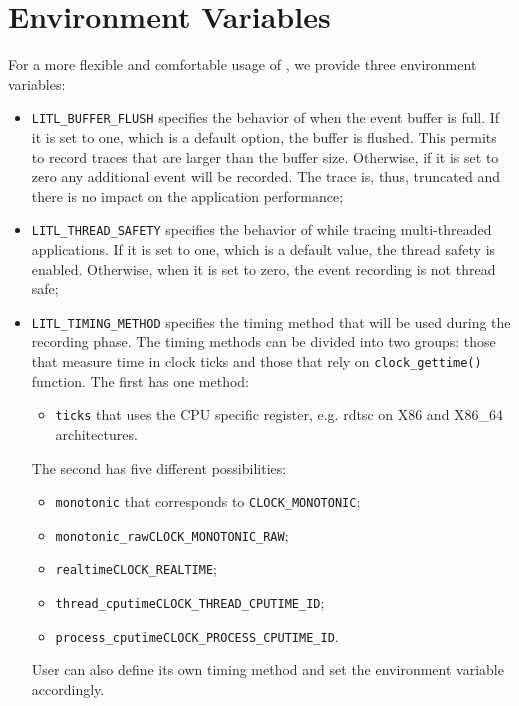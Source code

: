 \chapter{Environment Variables}
For a more flexible and comfortable usage of \litl{}, we provide three 
environment variables:
\begin{itemize}
 \item \texttt{LITL\_BUFFER\_FLUSH} specifies the behavior of \litl{} when the 
       event buffer is full. If it is set to one, which is a default option, 
       the buffer is flushed. This permits to record traces that are larger 
       than the buffer size. Otherwise, if it is set to zero any additional 
       event will be recorded. The trace is, thus, truncated and there is no 
       impact on the application performance;

 \item \texttt{LITL\_THREAD\_SAFETY} specifies the behavior of \litl{} while
       tracing multi-threaded applications. If it is set to one, which is a 
       default value, the thread safety is enabled. Otherwise, when it is set 
       to zero, the event recording is not thread safe;
 
 \item \texttt{LITL\_TIMING\_METHOD} specifies the timing method that will be 
       used during the recording phase. The \litl{} timing methods can be 
       divided into two groups: those that measure time in clock ticks and 
       those that rely on \texttt{clock\_gettime()} function. The first has one 
       method:
       \begin{itemize}
        \item \texttt{ticks} that uses the CPU specific register, e.g. rdtsc 
        on X86 and X86\_64 architectures.
       \end{itemize}     
       The second has five different possibilities:
       \begin{itemize}
        \item \texttt{monotonic} that corresponds to \texttt{CLOCK\_MONOTONIC};
        \item \texttt{monotonic\_raw}\dash{}\texttt{CLOCK\_MONOTONIC\_RAW};
        \item \texttt{realtime}\dash{}\texttt{CLOCK\_REALTIME};
        \item \texttt{thread\_cputime}\dash{}\texttt{CLOCK\_THREAD\_CPUTIME\_ID};        
        \item \texttt{process\_cputime}\dash{}\texttt{CLOCK\_PROCESS\_CPUTIME\_ID}.
       \end{itemize}
       User can also define its own timing method and set the environment 
       variable accordingly.
\end{itemize}


